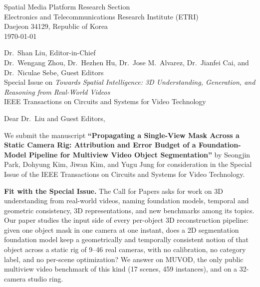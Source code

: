 \documentclass[11pt]{article}
\begin{document}
\noindent Spatial Media Platform Research Section\\
Electronics and Telecommunications Research Institute (ETRI)\\
Daejeon 34129, Republic of Korea\\[1ex]
\today

\noindent Dr.\ Shan Liu, Editor-in-Chief\\
Dr.\ Wengang Zhou, Dr.\ Hezhen Hu, Dr.\ Jose M.\ Alvarez, Dr.\ Jianfei Cai, and Dr.\ Niculae Sebe, Guest Editors\\
Special Issue on \emph{Towards Spatial Intelligence: 3D Understanding, Generation, and Reasoning from Real-World Videos}\\
IEEE Transactions on Circuits and Systems for Video Technology

Dear Dr.\ Liu and Guest Editors,

We submit the manuscript \textbf{``Propagating a Single-View Mask Across a Static Camera Rig: Attribution and Error Budget of a Foundation-Model Pipeline for Multiview Video Object Segmentation''} by Seongjin Park, Dohyung Kim, Jiwan Kim, and Yugu Jung for consideration in the Special Issue of the IEEE Transactions on Circuits and Systems for Video Technology.

\textbf{Fit with the Special Issue.} The Call for Papers asks for work on 3D understanding from real-world videos, naming foundation models, temporal and geometric consistency, 3D representations, and new benchmarks among its topics. Our paper studies the input side of every per-object 3D reconstruction pipeline: given one object mask in one camera at one instant, does a 2D segmentation foundation model keep a geometrically and temporally consistent notion of that object across a static rig of 9--46 real cameras, with no calibration, no category label, and no per-scene optimization? We answer on MUVOD, the only public multiview video benchmark of this kind (17 scenes, 459 instances), and on a 32-camera studio ring.
\end{document}
